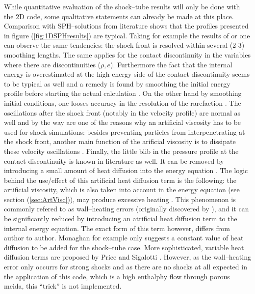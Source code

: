 \documentclass{report}
\begin{document}
While quantitative evaluation of the shock--tube results will only be done with the 2D code, some qualitative statements can already be made at this place.
Comparison with SPH--solutions from literature shows that the profiles presented in figure (\ref{fig:1DSPHresults}) are typical. Taking for example the results of \cite{Liu2003} or \cite{Monaghan1985} one can observe the same tendencies: the shock front is resolved within several (2-3) smoothing lengths. The same applies for the contact discontinuity in the variables where there are discontinuities ($\rho, e$). Furthermore the fact that the internal energy is overestimated at the high energy side of the contact discontinuity seems to be typical as well and a remedy is found by smoothing the initial energy profile before starting the actual calculation \cite{Monaghan2005,Price2004}. On the other hand by smoothing initial conditions, one looses accuracy in the resolution of the rarefaction \cite{Price2004}.  The oscillations after the shock front (notably in the velocity profile) are normal as well and by the way are one of the reasons why an artificial viscosity has to be used for shock simulations: besides preventing particles from interpenetrating at the shock front, another main function of the arificial viscosity is to dissipate these velocity oscillations \cite{Monaghan2005,Sigalotti2006}.
Finally, the little blib in the pressure profile at the contact discontinuity is known in literature as well. It can be removed by introducing a small amount of heat diffusion into the energy equation \cite{Monaghan1992}. The logic behind the use/effect of this artificial heat diffusion term is the following: the artificial viscosity, which is also taken into account in the energy equation (see section (\ref{sec:ArtVisc})), may produce excessive heating \cite{Sigalotti2006}. This phenomenon is commonly refered to as wall--heating errors (originally discovered by \cite{Noh1978}), and it can be significantly reduced by introducing an atrificial heat diffusion term to the internal energy equation. The exact form of this term however, differs from author to author. Monaghan \cite{Monaghan1992} for example only suggests a constant value of heat diffusion to be added for the shock--tube case. More sophisticated, variable heat diffusion terms are proposed by Price \cite{Price2004} and Sigalotti \cite{Sigalotti2006}.
However, as the wall--heating error only occurrs for strong shocks and as there are no shocks at all expected in the application of this code, which is a high enthalphy flow through porous meida, this ``trick'' is not implemented. 
\end{document}
